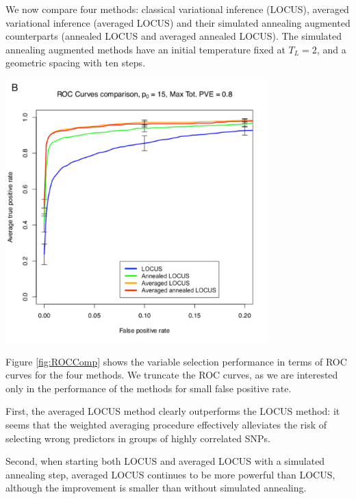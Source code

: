 \documentclass[final]{beamer}
\newenvironment{Figure}
  {\par\noindent\minipage{\linewidth}}
  {\endminipage\par}
\begin{document}
\begin{multicols*}{3}
\vspace{1em}
We now compare four methods: classical variational inference (LOCUS), averaged variational inference (averaged LOCUS) and their simulated annealing augmented counterparts (annealed LOCUS and averaged annealed LOCUS). The simulated annealing augmented methods have an initial temperature fixed at $T_L = 2$, and a geometric spacing with ten steps. 

\begin{Figure}
\centering
\includegraphics[width=4in, bb=0 0 500 500]{images/ROC_Comp_p0_15_var_0_8.pdf}
\end{Figure}
\vspace{1em}
Figure \ref{fig:ROCComp} shows the variable selection performance in terms of ROC curves for the four methods. We truncate the ROC curves, as we are interested only in the performance of the methods for small false positive rate.

First, the averaged LOCUS method clearly outperforms the LOCUS method: it seems that the weighted averaging procedure effectively alleviates the risk of selecting wrong predictors in groups of highly correlated SNPs.

Second, when starting both LOCUS and averaged LOCUS with a simulated annealing step, averaged LOCUS continues to be more powerful than LOCUS, although the improvement is smaller than without simulated annealing. 


\end{multicols*}
\end{document}
